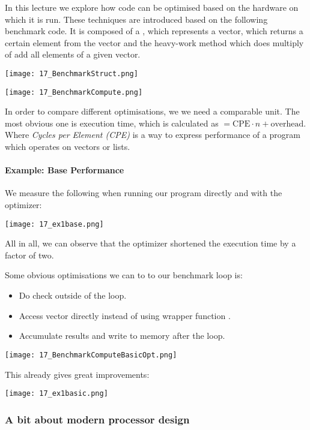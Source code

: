 
In this lecture we explore how code can be optimised based on the hardware on which it is run. These techniques are introduced based on the following benchmark code. It is composed of a , which represents a vector,  which returns a certain element from the vector and the heavy-work method  which does multiply of add all elements of a given vector.

\texttt{[image: 17\_BenchmarkStruct.png]}

\texttt{[image: 17\_BenchmarkCompute.png]}

In order to compare different optimisations, we we need a comparable unit. The most obvious one is execution time, which is calculated as $= \text{CPE} \cdot n + \text{overhead}$. Where \textit{Cycles per Element (CPE)} is a way to express performance of a program which operates on vectors or lists.

\paragraph{Example: Base Performance}
We measure the following when running our program directly and with the  optimizer:

\texttt{[image: 17\_ex1base.png]}

All in all, we can observe that the optimizer shortened the execution time by a factor of two.

Some obvious optimisations we can to to our benchmark loop is:
\begin{itemize}
    \item Do  check outside of the loop.
    \item Access vector directly instead of using wrapper function .
    \item Accumulate results and write to memory after the loop.
\end{itemize}

\texttt{[image: 17\_BenchmarkComputeBasicOpt.png]}

This already gives great improvements:

\texttt{[image: 17\_ex1basic.png]}

\subsubsection{A bit about modern processor design}

